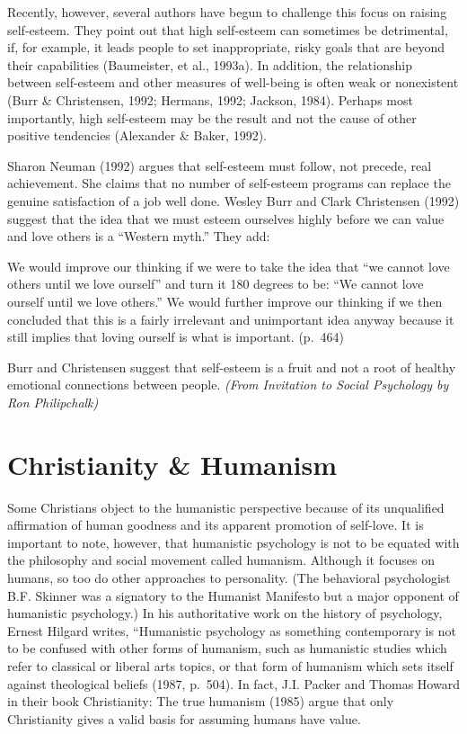 \documentclass[
]{book}
\begin{document}
Recently, however, several authors have begun to challenge this focus on raising self-esteem. They point out that high self-esteem can sometimes be detrimental, if, for example, it leads people to set inappropriate, risky goals that are beyond their capabilities (Baumeister, et al., 1993a). In addition, the relationship between self-esteem and other measures of well-being is often weak or nonexistent (Burr \& Christensen, 1992; Hermans, 1992; Jackson, 1984). Perhaps most importantly, high self-esteem may be the result and not the cause of other positive tendencies (Alexander \& Baker, 1992).

Sharon Neuman (1992) argues that self-esteem must follow, not precede, real achievement. She claims that no number of self-esteem programs can replace the genuine satisfaction of a job well done. Wesley Burr and Clark Christensen (1992) suggest that the idea that we must esteem ourselves highly before we can value and love others is a ``Western myth.'' They add:

We would improve our thinking if we were to take the idea that ``we cannot love others until we love ourself'' and turn it 180 degrees to be: ``We cannot love ourself until we love others.'' We would further improve our thinking if we then concluded that this is a fairly irrelevant and unimportant idea anyway because it still implies that loving ourself is what is important. (p.~464)

Burr and Christensen suggest that self-esteem is a fruit and not a root of healthy emotional connections between people. \emph{(From Invitation to Social Psychology by Ron Philipchalk)}

\hypertarget{christianity-humanism}{%
\section{Christianity \& Humanism}\label{christianity-humanism}}

Some Christians object to the humanistic perspective because of its unqualified affirmation of human goodness and its apparent promotion of self-love. It is important to note, however, that humanistic psychology is not to be equated with the philosophy and social movement called humanism. Although it focuses on humans, so too do other approaches to personality. (The behavioral psychologist B.F. Skinner was a signatory to the Humanist Manifesto but a major opponent of humanistic psychology.) In his authoritative work on the history of psychology, Ernest Hilgard writes, ``Humanistic psychology as something contemporary is not to be confused with other forms of humanism, such as humanistic studies which refer to classical or liberal arts topics, or that form of humanism which sets itself against theological beliefs (1987, p.~504). In fact, J.I. Packer and Thomas Howard in their book Christianity: The true humanism (1985) argue that only Christianity gives a valid basis for assuming humans have value.
\end{document}
